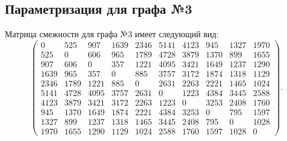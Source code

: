 \begin{table}[H]
\begin{center}
\begin{tabular}{
    |S[table-format=5.2]
    |S[table-format=5.2]
    |S[table-format=5.2]
    |S[table-format=5.2]
    |S[table-format=5.2]
    |S[table-format=5.2]|
    }
    \end{tabular}
  \end{center}
\end{table}

\subsection{Параметризация для графа №3}
Матрица смежности для графа №3 имеет следующий вид:
\begin{equation}
	\begin{pmatrix}
		0 & 525 & 907 & 1639 & 2346 & 5141 & 4123 & 945 & 1327 & 1970\\
		525 & 0 & 606 & 965 & 1789 & 4728 & 3879 & 1370 & 899 & 1655\\
		907 & 606 & 0 & 357 & 1221 & 4095 & 3421 & 1649 & 1237 & 1290\\
		1639 & 965 & 357 & 0 & 885 & 3757 & 3172 & 1874 & 1318 & 1129\\
		2346 & 1789 & 1221 & 885 & 0 & 2631 & 2263 & 2221 & 1465 & 1024\\
		5141 & 4728 & 4095 & 3757 & 2631 & 0 & 1223 & 4384 & 3445 & 2588\\
		4123 & 3879 & 3421 & 3172 & 2263 & 1223 & 0 & 3253 & 2408 & 1760\\
		945 & 1370 & 1649 & 1874 & 2221 & 4384 & 3253 & 0 & 795 & 1597\\
		1327 & 899 & 1237 & 1318 & 1465 & 3445 & 2408 & 795 & 0 & 1028\\
		1970 & 1655 & 1290 & 1129 & 1024 & 2588 & 1760 & 1597 & 1028 & 0
	\end{pmatrix}.
\end{equation}

